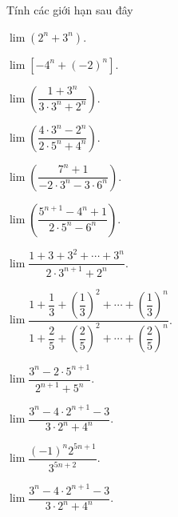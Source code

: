 \begin{ex}%
	Tính các  giới hạn sau đây
	\begin{listEX}[2]
		\item $\lim \left(2^n+3^n\right)$. 
		\item $\lim  \left[-4^n+(-2)^n\right]$.
		\item $\lim  \left(\dfrac{1+3^n}{3\cdot 3^n+2^n}\right)$.
		\item $\lim \left(\dfrac{4\cdot 3^n-2^n}{2\cdot  5^n+4^n}\right)$.
		\item  $\lim \left(\dfrac{7^n+1}{-2\cdot 3^n-3\cdot 6^n}\right)$.
		 \item $\lim \left(\dfrac{5^{n+1}-4^n+1}{2\cdot 5^n-6^n}\right)$.
		\item $\lim \dfrac{1+3+3^2+\cdots+3^n}{2\cdot 3^{n+1}+2^n}$. 
		\item  $\lim \dfrac{1+\dfrac{1}{3}+\left(\dfrac{1}{3}\right)^2+\cdots+\left(\dfrac{1}{3}\right)^n}{1+\dfrac{2}{5}+\left(\dfrac{2}{5}\right)^2+\cdots+\left(\dfrac{2}{5}\right)^n}$.
		\item $\lim \dfrac{3^n-2\cdot 5^{n+1}}{2^{n+1}+5^n}$. 
		 \item $\lim \dfrac{3^n-4\cdot 2^{n+1}-3}{3\cdot 2^n+4^n}$.
		\item $\lim  \dfrac{(-1)^n 2^{5n+1}}{3^{5n+2}}$.
		\item $\lim \dfrac{3^n-4\cdot  2^{n+1}-3}{3\cdot 2^n+4^n}$.
	\end{listEX}
\end{ex}
